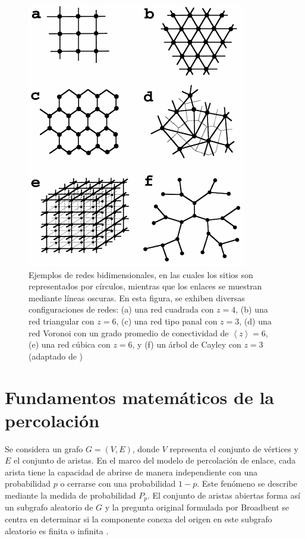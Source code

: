 \begin{figure}[ht]
	\centering\includegraphics[width=\imsize]{distitnasredes.png}
	\caption[Ejemplos de redes bidimensionales.]{ Ejemplos de redes bidimensionales, en las cuales los sitios son representados por círculos, mientras que los enlaces se muestran mediante líneas oscuras. En esta figura, se exhiben diversas configuraciones de redes: (a) una red cuadrada con  $z=4$, (b) una red triangular con  $z=6$, (c) una red tipo panal con $z=3$, (d) una red Voronoi con un grado promedio de conectividad de $\left\langle z \right\rangle = 6$, (e) una red cúbica con  $z=6$, y (f) un árbol de Cayley con  $z=3$ (adaptado de \protect\cite{berkowitz_percolation_1998})}\label{fig:distitnasredes}
\end{figure}






\section{Fundamentos matemáticos de la percolación}\label{sec:matematicaspercolacion}

Se considera un grafo $G=(V,E)$, donde $V$ representa el conjunto de vértices y $E$ el conjunto de aristas. En el marco del modelo de percolación de enlace, cada arista tiene la capacidad de abrirse de manera independiente con una probabilidad $p$ o cerrarse con una probabilidad $1-p$. Este fenómeno se describe mediante la medida de probabilidad $P_p$. El conjunto de aristas abiertas forma así un subgrafo aleatorio de $G$ y la pregunta original formulada por Broadbent se centra en determinar si la componente conexa del origen en este subgrafo aleatorio es finita o infinita \cite{beffara_percolation_2006}.



